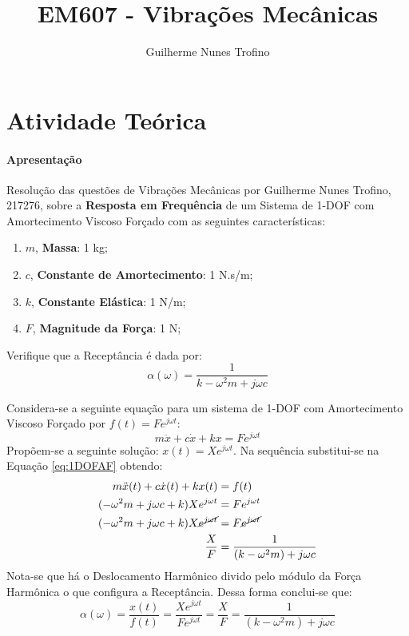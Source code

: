 \documentclass{article}
\title{EM607 - Vibrações Mecânicas}
\author{Guilherme Nunes Trofino}
\begin{document}
    \maketitle
\newpage

\section{Atividade Teórica}
\paragraph{Apresentação}Resolução das questões de Vibrações Mecânicas por Guilherme Nunes Trofino, 217276, sobre a \textbf{Resposta em Frequência} de um Sistema de 1-DOF com Amortecimento Viscoso Forçado com as seguintes características:
\begin{enumerate}
    \item $m$, \textbf{Massa}: 1 kg;
    \item $c$, \textbf{Constante de Amortecimento}: 1 N.s/m;
    \item $k$, \textbf{Constante Elástica}: 1 N/m;
    \item $F$, \textbf{Magnitude da Força}: 1 N;
\end{enumerate}
\begin{exercise}\label{ex1}
    Verifique que a Receptância é dada por:
    \begin{equation}
        \alpha (\omega) = \frac{1}{k - \omega^2 m + j\omega c}
    \end{equation}
\end{exercise}
\begin{resolution}
    Considera-se a seguinte equação para um sistema de 1-DOF com Amortecimento Viscoso Forçado por $f(t) = F e^{j\omega t}$:
    \begin{equation}
        m\ddot{x} + c\dot{x} + k x = F e^{j\omega t}\label{eq:1DOFAF}
    \end{equation}
    \noindent Propõem-se a seguinte solução: $x(t) = X e^{j\omega t}$. Na sequência substitui-se na Equação \ref{eq:1DOFAF} obtendo:
    \begin{align*}
        m\ddot{x}(t) + c\dot{x}(t) + k x(t) &= f(t)\\
        (-\omega^2 m + j \omega c + k) X e^{j\omega t} &= F e^{j\omega t}\\
        (-\omega^2 m + j \omega c + k) X \cancel{e^{j\omega t}} &= F \cancel{e^{j\omega t}}\\
        \frac{X}{F} &= \frac{1}{(k -\omega^2 m) + j \omega c}
    \end{align*}
    Nota-se que há o Deslocamento Harmônico divido pelo módulo da Força Harmônica o que configura a Receptância. Dessa forma conclui-se que:
    \begin{equation}
        \boxed{
            \alpha (\omega) = 
            \frac{x(t)}{f(t)} = 
            \frac{X e^{j\omega t}}{F e^{j\omega t}} = 
            \frac{X}{F} = 
            \frac{1}{(k -\omega^2 m) + j \omega c}
        }
    \end{equation}
\end{resolution}
\end{document}
